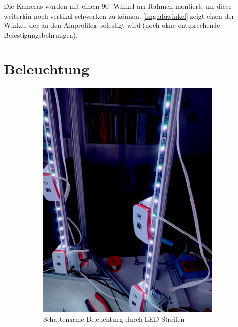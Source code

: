 \documentclass[./00PhotoBox.tex]{subfiles}
\begin{document}
Die Kameras wurden mit einem $90^\circ$-Winkel am Rahmen montiert, um diese weiterhin noch vertikal schwenken zu können. \autoref{img:aluwinkel} zeigt einen der Winkel, der an den Aluprofilen befestigt wird (noch ohne entsprechende Befestigungsbohrungen).


\section{Beleuchtung}

\begin{figure}
    \centering
    \begin{subfigure}{0.45\textwidth}
        \includegraphics[height=1.2\linewidth]{./img/beleuchtung.jpg}
        \centering
        \caption{Schattenarme Beleuchtung durch LED-Streifen}
        \label{img:led_streifen}
    \end{subfigure}
    \begin{subfigure}{0.45\textwidth}

\end{subfigure}
\end{figure}
\end{document}
